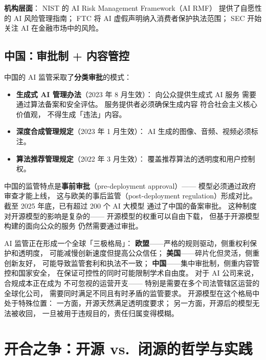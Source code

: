 \textbf{机构层面}：
NIST 的 AI Risk Management Framework（AI RMF）
提供了自愿性的 AI 风险管理指南；
FTC 将 AI 虚假声明纳入消费者保护执法范围；
SEC 开始关注 AI 在金融市场中的风险。

\subsection{中国：审批制 + 内容管控}

中国的 AI 监管采取了\textbf{分类审批}的模式：

\begin{itemize}[noitemsep]
  \item \textbf{生成式 AI 管理办法}（2023 年 8 月生效）：
        向公众提供生成式 AI 服务
        需要通过算法备案和安全评估。
        服务提供者必须确保生成内容
        符合社会主义核心价值观，
        不得生成「违法」内容。
  \item \textbf{深度合成管理规定}（2023 年 1 月生效）：
        AI 生成的图像、音频、视频必须标注。
  \item \textbf{算法推荐管理规定}（2022 年 3 月生效）：
        覆盖推荐算法的透明度和用户控制权。
\end{itemize}

中国的监管特点是\textbf{事前审批}（pre-deployment approval）——
模型必须通过政府审查才能上线，
这与欧美的事后监管（post-deployment regulation）形成对比。
截至 2025 年底，已有超过 200 个 AI 大模型
通过了中国的备案审批。
这种制度对开源模型的影响是复杂的——
开源模型的权重可以自由下载，
但基于开源模型构建的面向公众的服务
仍然需要通过审批。

\begin{warnbox}
AI 监管正在形成一个全球「三极格局」：
\textbf{欧盟}——严格的规则驱动，侧重权利保护和透明度，
可能减慢创新速度但提高公众信任；
\textbf{美国}——碎片化但灵活，侧重创新友好，
可能导致监管套利和执法不一致；
\textbf{中国}——集中审批制，侧重内容管控和国家安全，
在保证可控性的同时可能限制学术自由度。
对于 AI 公司来说，合规成本正在成为
不可忽视的运营开支——
特别是需要在多个司法管辖区运营的全球化公司，
需要同时满足不同且有时矛盾的监管要求。
开源模型在这个格局中处于特殊位置：
一方面，开源天然满足透明度要求；
另一方面，开源后的模型无法被收回，
一旦被用于违规目的，责任归属变得模糊。
\end{warnbox}

\section{开合之争：开源 vs.\ 闭源的哲学与实践}

